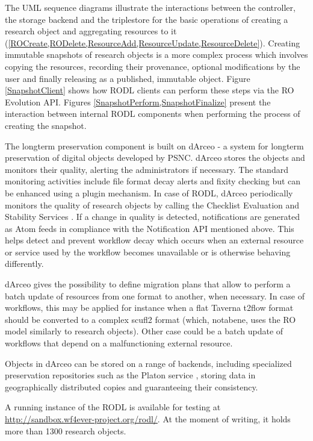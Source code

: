 The UML sequence diagrams illustrate the interactions between the controller, the storage backend and the triplestore for the basic operations of creating a research object and aggregating resources to it (\ref{ROCreate,RODelete,ResourceAdd,ResourceUpdate,ResourceDelete}). Creating immutable snapshots of research objects is a more complex process which involves copying the resources, recording their provenance, optional modifications by the user and finally releasing as a published, immutable object. Figure \ref{SnapshotClient} shows how RODL clients can perform these steps via the RO Evolution API. Figures \ref{SnapshotPerform,SnapshotFinalize} present the interaction between internal RODL components when performing the process of creating the snapshot.

The longterm preservation component is built on dArceo \cite{dArceo} - a system for longterm preservation of digital objects developed by PSNC. dArceo stores the objects and monitors their quality, alerting the administrators if necessary. The standard monitoring activities include file format decay alerts and fixity checking but can be enhanced using a plugin mechanism. In case of RODL, dArceo periodically monitors the quality of research objects by calling the Checklist Evaluation and Stability Services \cite{Checklist-API,Stability-API}. If a change in quality is detected, notifications are generated as Atom feeds in compliance with the Notification API mentioned above. This helps detect and prevent workflow decay which occurs when an external resource or service used by the workflow becomes unavailable or is otherwise behaving differently.

dArceo gives the possibility to define migration plans that allow to perform a batch update of resources from one format to another, when necessary. In case of workflows, this may be applied for instance when a flat Taverna t2flow format should be converted to a complex scufl2 format (which, notabene, uses the RO model similarly to research objects). Other case could be a batch update of workflows that depend on a malfunctioning external resource.

Objects in dArceo can be stored on a range of backends, including specialized preservation repositories such as the Platon service \cite{Platon}, storing data in geographically distributed copies and guaranteeing their consistency.

A running instance of the RODL is available for testing at \url{http://sandbox.wf4ever-project.org/rodl/}. At the moment of writing, it holds more than 1300 research objects.


